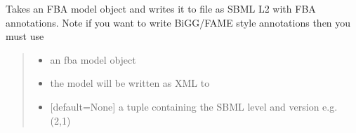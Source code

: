 \documentclass[letterpaper,12pt,english]{sphinxmanual}
\begin{document}
\begin{fulllineitems}

\pysigstartsignatures
\pysiglinewithargsret
{}
{\sphinxparamcomma {}\sphinxparamcomma {}\sphinxparamcomma {}}
{}
\pysigstopsignatures
\sphinxAtStartPar
Takes an FBA model object and writes it to file as SBML L2 with FBA annotations. Note if you want to write BiGG/FAME style annotations then you must use 
\begin{quote}\begin{description}
\begin{itemize}
\item {} 
\sphinxAtStartPar
{} \textendash{} an fba model object

\item {} 
\sphinxAtStartPar
{} \textendash{} the model will be written as XML to 

\item {} 
\sphinxAtStartPar
{} \textendash{} {[}default=None{]} a tuple containing the SBML level and version e.g. (2,1)

\end{itemize}

\end{description}\end{quote}

\end{fulllineitems}
\end{document}
